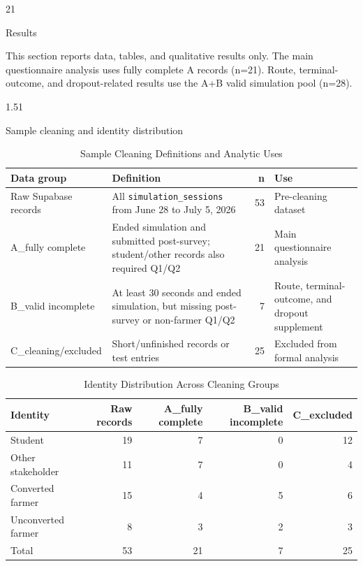 \documentclass[stu,12pt,floatsintext,donotrepeattitle]{apa7}
\makeatletter
\newcommand{\Sanhao}{\fontsize{16pt}{20pt}\selectfont}
\newcommand{\Sihao}{\fontsize{14pt}{18pt}\selectfont}
\renewcommand{\section}{\@startsection{section}{1}{\z@}%
  {2\baselineskip}{1\baselineskip}%
  {\normalfont\Sanhao\bfseries\raggedright}}
\renewcommand{\subsection}{\@startsection{subsection}{2}{\z@}%
  {1.5\baselineskip}{1\baselineskip}%
  {\normalfont\Sihao\bfseries\raggedright}}
\makeatother
\begin{document}
\section{Results}

This section reports data, tables, and qualitative results only. The main questionnaire analysis uses fully complete A records (n=21). Route, terminal-outcome, and dropout-related results use the A+B valid simulation pool (n=28).

\subsection{Sample cleaning and identity distribution}

\begin{table}[htbp]
\centering
\footnotesize
\begin{tabularx}{\textwidth}{@{}P{0.20\textwidth}XrP{0.22\textwidth}@{}}
\toprule
Data group & Definition & n & Use \\
\midrule
Raw Supabase records & All \texttt{simulation\_sessions} from June 28 to July 5, 2026 & 53 & Pre-cleaning dataset \\
A\_fully complete & Ended simulation and submitted post-survey; student/other records also required Q1/Q2 & 21 & Main questionnaire analysis \\
B\_valid incomplete & At least 30 seconds and ended simulation, but missing post-survey or non-farmer Q1/Q2 & 7 & Route, terminal-outcome, and dropout supplement \\
C\_cleaning/excluded & Short/unfinished records or test entries & 25 & Excluded from formal analysis \\
\bottomrule
\end{tabularx}
\caption{Sample Cleaning Definitions and Analytic Uses}
\label{tab:sample-cleaning}
\end{table}

\begin{table}[htbp]
\centering
\begin{tabular}{@{}lrrrr@{}}
\toprule
Identity & Raw records & A\_fully complete & B\_valid incomplete & C\_excluded \\
\midrule
Student & 19 & 7 & 0 & 12 \\
Other stakeholder & 11 & 7 & 0 & 4 \\
Converted farmer & 15 & 4 & 5 & 6 \\
Unconverted farmer & 8 & 3 & 2 & 3 \\
Total & 53 & 21 & 7 & 25 \\
\bottomrule
\end{tabular}
\caption{Identity Distribution Across Cleaning Groups}
\label{tab:identity-distribution}
\end{table}
\end{document}
